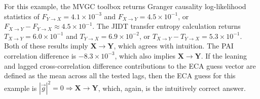 For this example, the MVGC toolbox returns Granger causality log-likelihood statistics of $F_{Y\rightarrow X}=4.1\times 10^{-3}$ and $F_{X\rightarrow Y}=4.5\times 10^{-1}$, or $F_{X\rightarrow Y}-F_{Y\rightarrow X}\approx4.5\times 10^{-1}$.  The JIDT transfer entropy calculation returns $T_{X\rightarrow Y}=6.0\times 10^{-1}$ and $T_{Y\rightarrow X}=6.9\times 10^{-2}$, or $T_{X\rightarrow Y}-T_{Y\rightarrow X}=5.3\times 10^{-1}$.  Both of these results imply $\mathbf{X}\rightarrow\mathbf{Y}$, which agrees with intuition.  The PAI correlation difference is $-8.3\times 10^{-3}$, which also implies $\mathbf{X}\rightarrow\mathbf{Y}$.  If the leaning and lagged cross-correlation difference contributions to the ECA guess vector are defined as the mean across all the tested lags, then the ECA guess for this example is $|\vec{g}|^2=0\Rightarrow \mathbf{X}\rightarrow\mathbf{Y}$, which, again, is the intuitively correct answer.  

